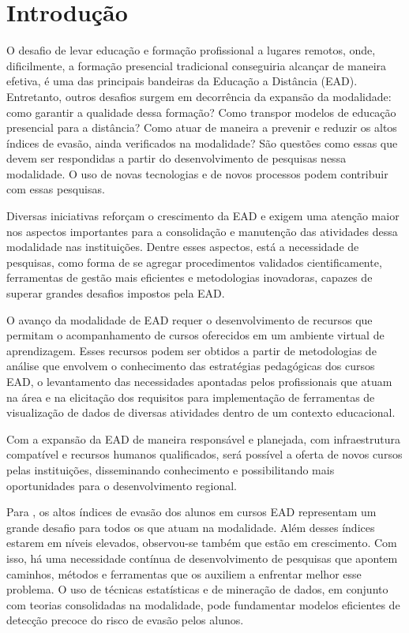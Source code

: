 \chapter{Introdução}

O desafio de levar educação e formação profissional a lugares remotos, onde,
dificilmente, a formação presencial tradicional conseguiria alcançar de maneira
efetiva, é uma das principais bandeiras da Educação a Distância (EAD).
Entretanto, outros desafios surgem em decorrência da expansão da modalidade:
como garantir a qualidade dessa formação? Como transpor modelos de educação
presencial para a distância? Como atuar de maneira a prevenir e reduzir os altos
índices de evasão, ainda verificados na modalidade? São questões como essas que
devem ser respondidas a partir do desenvolvimento de pesquisas nessa modalidade.
O uso de novas tecnologias e de novos processos podem contribuir com essas
pesquisas.

Diversas iniciativas reforçam o crescimento da EAD e exigem uma atenção maior
nos aspectos importantes para a consolidação e manutenção das atividades dessa
modalidade nas instituições. Dentre esses aspectos, está a necessidade de
pesquisas, como forma de se agregar procedimentos validados cientificamente,
ferramentas de gestão mais eficientes e metodologias inovadoras, capazes de
superar grandes desafios impostos pela EAD.

O avanço da modalidade de EAD requer o desenvolvimento de recursos que permitam
o acompanhamento de cursos oferecidos em um ambiente virtual de aprendizagem.
Esses recursos podem ser obtidos a partir de metodologias de análise que
envolvem o conhecimento das estratégias pedagógicas dos cursos EAD, o
levantamento das necessidades apontadas pelos profissionais que atuam na área e
na elicitação dos requisitos para implementação de ferramentas de visualização
de dados de diversas atividades dentro de um contexto educacional.
\cite{ramos2016abordagem}

Com a expansão da EAD de maneira responsável e planejada, com infraestrutura
compatível e recursos humanos qualificados, será possível a oferta de novos
cursos pelas instituições, disseminando conhecimento e possibilitando mais
oportunidades para o desenvolvimento regional.

Para , os altos índices de evasão dos alunos em
cursos EAD representam um grande desafio para todos os que atuam na modalidade.
Além desses índices estarem em níveis elevados, observou-se também que estão em
crescimento. Com isso, há uma necessidade contínua de desenvolvimento de
pesquisas que apontem caminhos, métodos e ferramentas que os auxiliem a
enfrentar melhor esse problema. O uso de técnicas estatísticas e de mineração de
dados, em conjunto com teorias consolidadas na modalidade, pode fundamentar
modelos eficientes de detecção precoce do risco de evasão pelos alunos.

